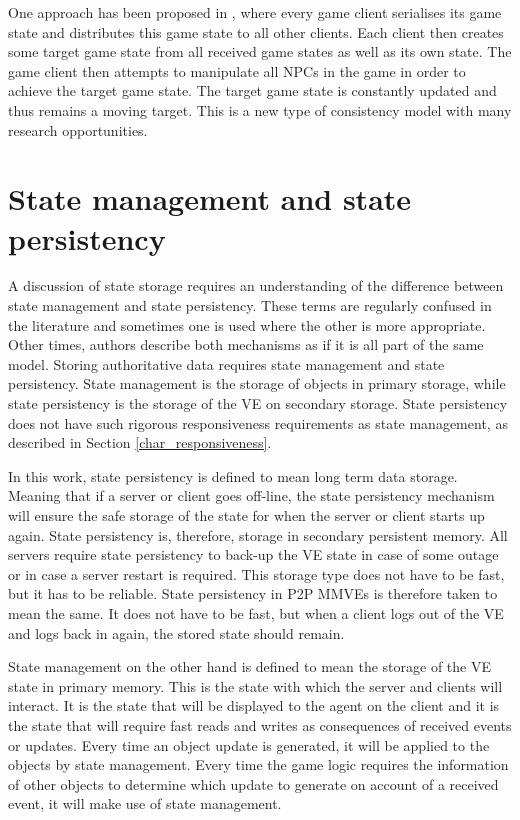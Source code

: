 One approach has been proposed in \cite{Chandler_disconnected_games}, where every game client serialises its game state and distributes this game state to all other clients. Each client then creates some target game state from all received game states as well as its own state. The game client then attempts to manipulate all NPCs in the game in order to achieve the target game state. The target game state is constantly updated and thus remains a moving target. This is a new type of consistency model with many research opportunities.

\section{State management and state persistency}

A discussion of state storage requires an understanding of the difference between state management and state persistency. These terms are regularly confused in the literature and sometimes one is used where the other is more appropriate. Other times, authors describe both mechanisms as if it is all part of the same model. Storing authoritative data requires state management and state persistency. State management is the storage of objects in primary storage, while state persistency is the storage of the VE on secondary storage. State persistency does not have such rigorous responsiveness requirements as state management, as described in Section \ref{char_responsiveness}.

In this work, state persistency is defined to mean long term data storage. Meaning that if a server or client goes off-line, the state persistency mechanism will ensure the safe storage of the state for when the server or client starts up again. State persistency is, therefore, storage in secondary persistent memory. All servers require state persistency to back-up the VE state in case of some outage or in case a server restart is required. This storage type does not have to be fast, but it has to be reliable. State persistency in P2P MMVEs is therefore taken to mean the same. It does not have to be fast, but when a client logs out of the VE and logs back in again, the stored state should remain.

State management on the other hand is defined to mean the storage of the VE state in primary memory. This is the state with which the server and clients will interact. It is the state that will be displayed to the agent on the client and it is the state that will require fast reads and writes as consequences of received events or updates. Every time an object update is generated, it will be applied to the objects by state management. Every time the game logic requires the information of other objects to determine which update to generate on account of a received event, it will make use of state management.

